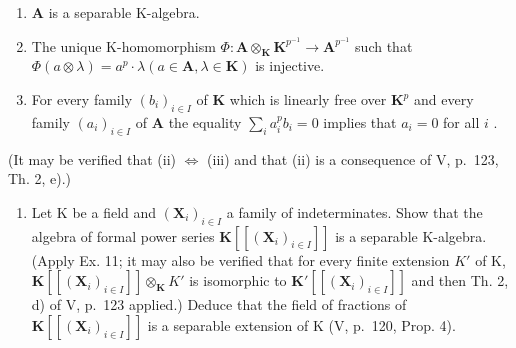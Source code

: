 \begin{enumerate}
\def\labelenumi{(\roman{enumi})}
\item
  \(\mathbf{A}\) is a separable K-algebra.
\item
  The unique K-homomorphism \(\Phi: \mathbf{A} \otimes_{\mathbf{K}} \mathbf{K}^{p^{-1}} \to \mathbf{A}^{p^{-1}}\) such that \(\Phi(a \otimes \lambda) = a^p \cdot \lambda (a \in \mathbf{A}, \lambda \in \mathbf{K})\) is injective.
\item
  For every family \((b_{i})_{i\in I}\) of \(\mathbf{K}\) which is linearly free over \(\mathbf{K}^p\) and every family \((a_{i})_{i\in I}\) of \(\mathbf{A}\) the equality \(\sum_{i}a_i^p b_i = 0\) implies that \(a_{i} = 0\) for all \(i\) .
\end{enumerate}

(It may be verified that (ii) \(\Leftrightarrow\) (iii) and that (ii) is a consequence of V, p.~123, Th. 2, e).)

\begin{enumerate}
\def\labelenumi{\arabic{enumi})}
\setcounter{enumi}{11}
\tightlist
\item
  Let K be a field and \((\mathbf{X}_{i})_{i\in I}\) a family of indeterminates. Show that the algebra of formal power series \(\mathbf{K}[[(\mathbf{X}_{i})_{i\in I}]]\) is a separable K-algebra. (Apply Ex. 11; it may also be verified that for every finite extension \(K'\) of K, \(\mathbf{K}[[(\mathbf{X}_{i})_{i\in I}]]\otimes_{\mathbf{K}}K'\) is isomorphic to \(\mathbf{K}'[[(\mathbf{X}_{i})_{i\in I}]]\) and then Th. 2, d) of V, p.~123 applied.) Deduce that the field of fractions of \(\mathbf{K}[[(\mathbf{X}_{i})_{i\in I}]]\) is a separable extension of K (V, p.~120, Prop. 4).
\end{enumerate}

